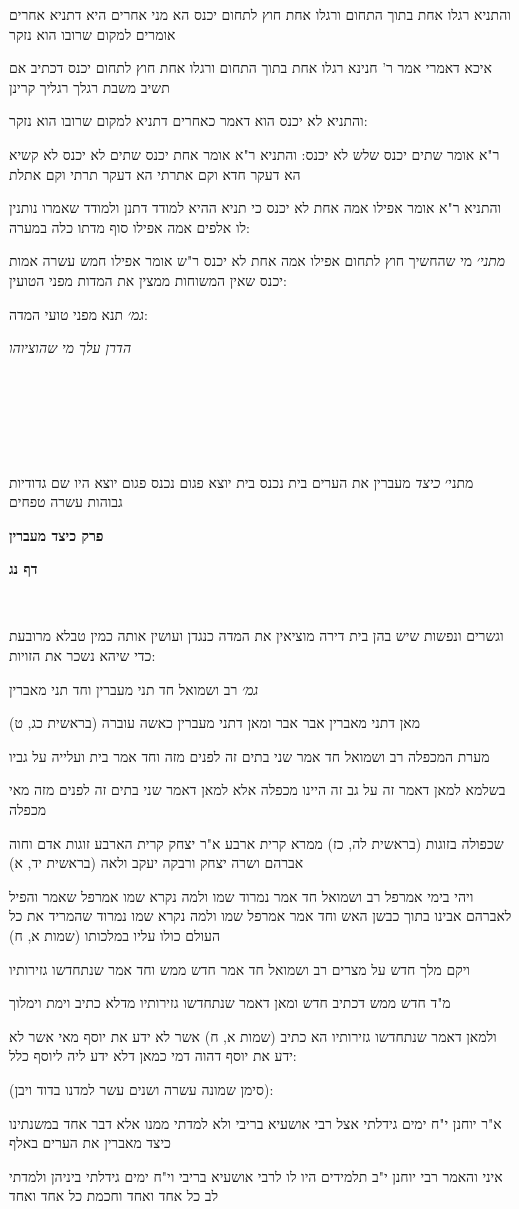 \documentclass[12pt, openany]{book}
\newcommand{\sethebfont}{
\fontsize{10.5pt}{21.0pt} \selectfont
}
\newcommand{\textblock}[1]{
{\sethebfont #1\\}	
}
\newcommand{\chapname}{}
\newcommand{\sectname}{}
\newcommand{\newchap}[1]{
	\addcontentsline{toc}{chapter}{#1}
	\renewcommand{\chapname}{#1}
		\begin{center}
			\textbf{%
\fontsize{16pt}{16pt}\selectfont
				#1}
		\end{center}
}
\newcommand{\newsection}[1]{
	\addcontentsline{toc}{section}{#1}
	\renewcommand{\sectname}{#1}	
	\vspace{-\baselineskip}
	\begin{center}
		\textbf{%
\fontsize{16pt}{16pt}\selectfont
			#1}
	\end{center}
	\vspace{-\baselineskip}
	\nopagebreak
}
\begin{document}
\textblock{והתניא רגלו אחת בתוך התחום ורגלו אחת חוץ לתחום יכנס הא מני אחרים היא דתניא אחרים אומרים למקום שרובו הוא נזקר}
\textblock{איכא דאמרי אמר ר' חנינא רגלו אחת בתוך התחום ורגלו אחת חוץ לתחום יכנס דכתיב אם תשיב משבת רגלך רגליך קרינן}
\textblock{והתניא לא יכנס הוא דאמר כאחרים דתניא למקום שרובו הוא נזקר:}
\textblock{ר"א אומר שתים יכנס שלש לא יכנס: והתניא ר"א אומר אחת יכנס שתים לא יכנס לא קשיא הא דעקר חדא וקם אתרתי הא דעקר תרתי וקם אתלת}
\textblock{והתניא ר"א אומר אפילו אמה אחת לא יכנס כי תניא ההיא למודד דתנן ולמודד שאמרו נותנין לו אלפים אמה אפילו סוף מדתו כלה במערה:}
\textblock{{\large\emph{מתני׳}} מי שהחשיך חוץ לתחום אפילו אמה אחת לא יכנס ר"ש אומר אפילו חמש עשרה אמות יכנס שאין המשוחות ממצין את המדות מפני הטועין:}
\textblock{{\large\emph{גמ׳}} תנא מפני טועי המדה:}
\textblock{\par \par {\large\emph{הדרן עלך מי שהוציוהו}}\par \par }
\textblock{}
\textblock{}
\textblock{מתני׳ {\large\emph{כיצד}} מעברין את הערים בית נכנס בית יוצא פגום נכנס פגום יוצא היו שם גדודיות גבוהות עשרה טפחים}
\newchap{פרק \quad כיצד מעברין}
\newsection{דף נג}
\textblock{}
\textblock{וגשרים ונפשות שיש בהן בית דירה מוציאין את המדה כנגדן ועושין אותה כמין טבלא מרובעת כדי שיהא נשכר את הזויות:}
\textblock{{\large\emph{גמ׳}} רב ושמואל חד תני מעברין וחד תני מאברין}
\textblock{מאן דתני מאברין אבר אבר ומאן דתני מעברין כאשה עוברה (בראשית כג, ט)}
\textblock{מערת המכפלה רב ושמואל חד אמר שני בתים זה לפנים מזה וחד אמר בית ועלייה על גביו}
\textblock{בשלמא למאן דאמר זה על גב זה היינו מכפלה אלא למאן דאמר שני בתים זה לפנים מזה מאי מכפלה}
\textblock{שכפולה בזוגות (בראשית לה, כז) ממרא קרית ארבע א"ר יצחק קרית הארבע זוגות אדם וחוה אברהם ושרה יצחק ורבקה יעקב ולאה (בראשית יד, א)}
\textblock{ויהי בימי אמרפל רב ושמואל חד אמר נמרוד שמו ולמה נקרא שמו אמרפל שאמר והפיל לאברהם אבינו בתוך כבשן האש וחד אמר אמרפל שמו ולמה נקרא שמו נמרוד שהמריד את כל העולם כולו עליו במלכותו (שמות א, ח)}
\textblock{ויקם מלך חדש על מצרים רב ושמואל חד אמר חדש ממש וחד אמר שנתחדשו גזירותיו}
\textblock{מ"ד חדש ממש דכתיב חדש ומאן דאמר שנתחדשו גזירותיו מדלא כתיב וימת וימלוך}
\textblock{ולמאן דאמר שנתחדשו גזירותיו הא כתיב (שמות א, ח) אשר לא ידע את יוסף מאי אשר לא ידע את יוסף דהוה דמי כמאן דלא ידע ליה ליוסף כלל:}
\textblock{(סימן שמונה עשרה ושנים עשר למדנו בדוד ויבן):}
\textblock{א"ר יוחנן י"ח ימים גידלתי אצל רבי אושעיא בריבי ולא למדתי ממנו אלא דבר אחד במשנתינו כיצד מאברין את הערים באלף}
\textblock{איני והאמר רבי יוחנן י"ב תלמידים היו לו לרבי אושעיא בריבי וי"ח ימים גידלתי ביניהן ולמדתי לב כל אחד ואחד וחכמת כל אחד ואחד}
\end{document}
